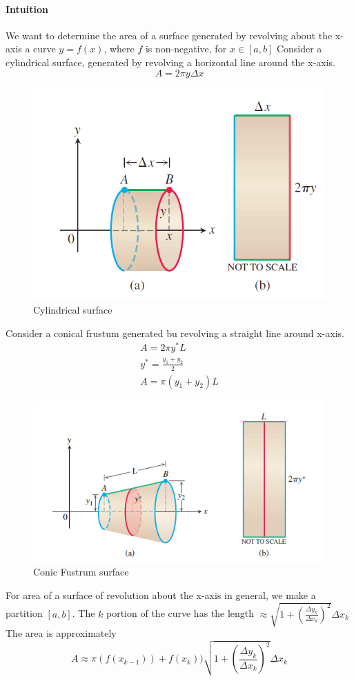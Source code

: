 \documentclass[12pt]{article}
\begin{document}
\paragraph{Intuition}
We want to determine the area of a surface generated by revolving about the x-axis a curve $y = f(x)$, where $f$ is non-negative, for $x \in [a, b]$
Consider a cylindrical surface, generated by revolving a horizontal line around the x-axis.
\[
    A = 2\pi y \Delta x
\]
\begin{figure}[H]
     \centering
     \includegraphics[width = 0.6\linewidth]{Images/cylindrical surface.png}
     \caption{Cylindrical surface}
\end{figure}
Consider a conical frustum generated bu revolving a straight line around x-axis.
\begin{align*} 
     A = 2 \pi y^* L \\
     y^* = \frac{y_1 + y_2}{2} \\
     A = \pi (y_1 + y_2) L 
\end{align*}
\begin{figure}[H]
    \centering
    \includegraphics[width = 0.6\linewidth]{Images/conic fustrum.png}
    \caption{Conic Fustrum surface}
\end{figure}
For area of a surface of revolution about the x-axis in general, we make a partition $[a, b]$.
The $k$ portion of the curve has the length $\approx \sqrt{1 + \left(\frac{\Delta y_k}{\Delta x_k} \right)^2} \Delta x_k$
The area is approximately
\[
    A \approx \pi (f(x_{k - 1})) + f(x_k)) \sqrt{1 + \left(\frac{\Delta y_k}{\Delta x_k} \right)^2} \Delta x_k
\]
\end{document}
